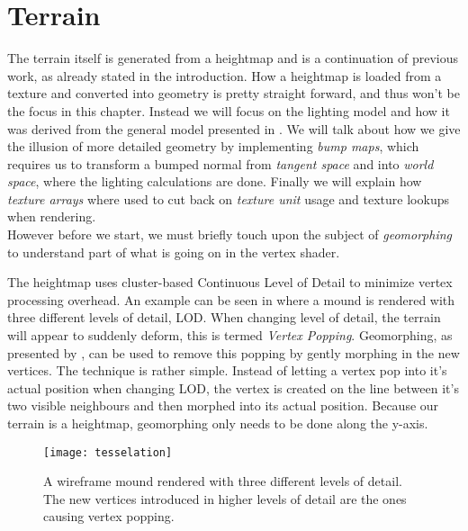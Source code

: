 \chapter{Terrain}


The terrain itself is generated from a heightmap and is a continuation
of previous work, as already stated in the introduction. How a
heightmap is loaded from a texture and converted into geometry is
pretty straight forward, and thus won't be the focus in this
chapter. Instead we will focus on the lighting model and how it was
derived from the general model presented in
. We will talk about how we give the illusion
of more detailed geometry by implementing \emph{bump maps}, which
requires us to transform a bumped normal from \emph{tangent space} and
into \emph{world space}, where the lighting calculations are
done. Finally we will explain how \emph{texture arrays} where used to
cut back on \emph{texture unit} usage and texture lookups when
rendering.\\


However before we start, we must briefly touch upon the subject of
\emph{geomorphing} to understand part of what is going on in the vertex
shader.


The heightmap uses cluster-based Continuous Level of Detail to
minimize vertex processing overhead. An example can be seen in
 where a mound is rendered with three
different levels of detail, LOD. When changing level of detail, the
terrain will appear to suddenly deform, this is termed \emph{Vertex
  Popping}. Geomorphing, as presented by , can be used
to remove this popping by gently morphing in the new vertices. The
technique is rather simple. Instead of letting a vertex pop into it's
actual position when changing LOD, the vertex is created on the line
between it's two visible neighbours and then morphed into its actual
position. Because our terrain is a heightmap, geomorphing only needs
to be done along the y-axis.

\begin{figure}
  \centering
  \texttt{[image: tesselation]}
  \caption{A wireframe mound rendered with three different levels of
    detail. The new vertices introduced in higher levels of detail are
    the ones causing vertex popping.}
  \label{fig:tessellation}
\end{figure}

